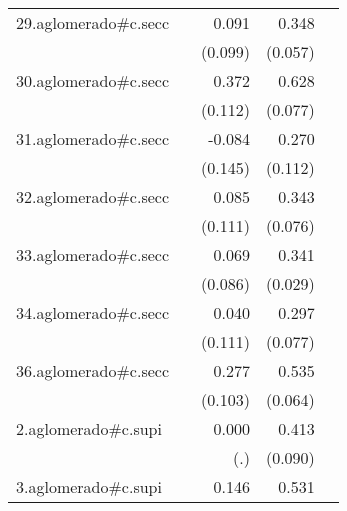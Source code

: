 {\begin{longtable}{l*{4}{D{.}{.}{-1}}}
\addlinespace
29.aglomerado#c.secc&                     &       0.091         &       0.348\sym{***}&                     \\
            &                     &     (0.099)         &     (0.057)         &                     \\
\addlinespace
30.aglomerado#c.secc&                     &       0.372\sym{***}&       0.628\sym{***}&                     \\
            &                     &     (0.112)         &     (0.077)         &                     \\
\addlinespace
31.aglomerado#c.secc&                     &      -0.084         &       0.270\sym{*}  &                     \\
            &                     &     (0.145)         &     (0.112)         &                     \\
\addlinespace
32.aglomerado#c.secc&                     &       0.085         &       0.343\sym{***}&                     \\
            &                     &     (0.111)         &     (0.076)         &                     \\
\addlinespace
33.aglomerado#c.secc&                     &       0.069         &       0.341\sym{***}&                     \\
            &                     &     (0.086)         &     (0.029)         &                     \\
\addlinespace
34.aglomerado#c.secc&                     &       0.040         &       0.297\sym{***}&                     \\
            &                     &     (0.111)         &     (0.077)         &                     \\
\addlinespace
36.aglomerado#c.secc&                     &       0.277\sym{**} &       0.535\sym{***}&                     \\
            &                     &     (0.103)         &     (0.064)         &                     \\
\addlinespace
2.aglomerado#c.supi&                     &       0.000         &       0.413\sym{***}&                     \\
            &                     &         (.)         &     (0.090)         &                     \\
\addlinespace
3.aglomerado#c.supi&                     &       0.146         &       0.531\sym{***}&                     \\

\end{longtable}}
